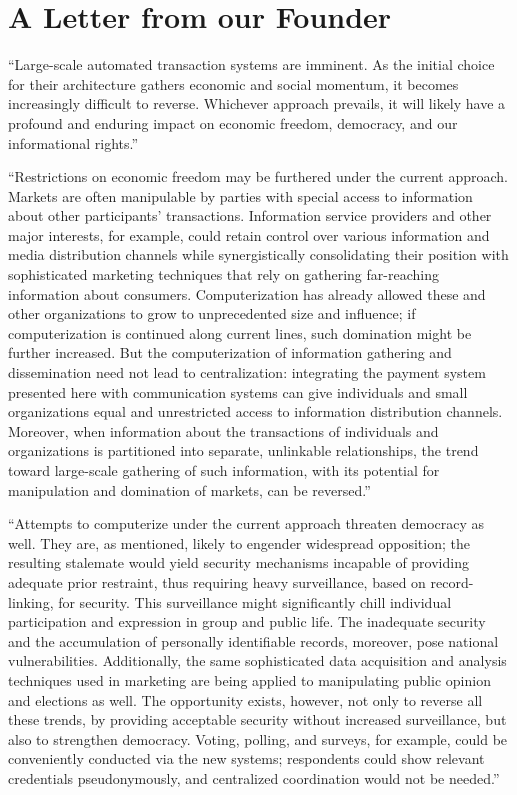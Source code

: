 \section*{A Letter from our Founder}

\footnotesize

``Large-scale automated transaction systems are imminent. As the initial choice for their architecture gathers economic and social momentum, it becomes increasingly difficult to reverse. Whichever approach prevails, it will likely have a profound and enduring impact on economic freedom, democracy, and our informational rights.''

``Restrictions on economic freedom may be furthered under the current approach. Markets are often manipulable by parties with special access to information about other participants' transactions. Information service providers and other major interests, for example, could retain control over various information and media distribution channels while synergistically consolidating their position with sophisticated marketing techniques that rely on gathering far-reaching information about consumers. Computerization has already allowed these and other organizations to grow to unprecedented size and influence; if computerization is continued along current lines, such domination might be further increased. But the computerization of information gathering and dissemination need not lead to centralization: integrating the payment system presented here with communication systems can give individuals and small organizations equal and unrestricted access to information distribution channels. Moreover, when information about the transactions of individuals and organizations is partitioned into separate, unlinkable relationships, the trend toward large-scale gathering of such information, with its potential for manipulation and domination of markets, can be reversed.''

``Attempts to computerize under the current approach threaten democracy as well. They are, as mentioned, likely to engender widespread opposition; the resulting stalemate would yield security mechanisms incapable of providing adequate prior restraint, thus requiring heavy surveillance, based on record-linking, for security. This surveillance might significantly chill individual participation and expression in group and public life. The inadequate security and the accumulation of personally identifiable records, moreover, pose national vulnerabilities. Additionally, the same sophisticated data acquisition and analysis techniques used in marketing are being applied to manipulating public opinion and elections as well. The opportunity exists, however, not only to reverse all these trends, by providing acceptable security without increased surveillance, but also to strengthen democracy. Voting, polling, and surveys, for example, could be conveniently conducted via the new systems; respondents could show relevant credentials pseudonymously, and centralized coordination would not be needed.''

